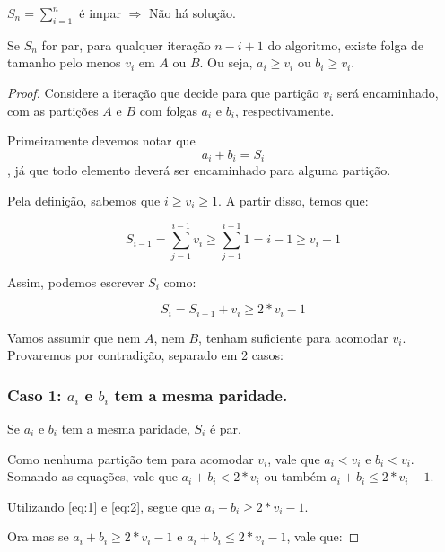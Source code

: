 \begin{prop} \label{particao:odd}
$S_n = \sum_{i = 1}^n$ é impar $\Rightarrow$ Não há solução.
\end{prop}

\begin{prop} \label{particao:proof}
Se $S_n$ for par, para qualquer iteração $n - i + 1$ do algoritmo, existe folga de tamanho pelo menos $v_i$ em $A$ ou $B$. Ou seja, $a_i \geq v_i$ ou $b_i \geq v_i$.
\end{prop}
\begin{proof}

Considere a iteração que decide para que partição $v_i$ será encaminhado, com as partições $A$ e $B$ com folgas $a_i$ e $b_i$, respectivamente.

Primeiramente devemos notar que
\begin{equation} \label{eq:1}
    a_i + b_i = S_i
\end{equation}
, já que todo elemento deverá ser encaminhado para alguma partição.

Pela definição, sabemos que $i \geq v_i \geq 1$. A partir disso, temos que:

$$S_{i - 1} = \sum_{j = 1}^{i - 1} v_i \geq \sum_{j = 1}^{i - 1} 1 = i - 1 \geq v_i - 1$$

Assim, podemos escrever $S_i$ como:

\begin{equation} \label{eq:2}
    S_i = S_{i - 1} + v_i \geq 2*v_i - 1
\end{equation}

Vamos assumir que nem $A$, nem $B$, tenham  suficiente para acomodar $v_i$. Provaremos por contradição, separado em 2 casos:

\subsubsection*{Caso 1: $a_i$ e $b_i$ tem a mesma paridade.}

Se $a_i$ e $b_i$ tem a mesma paridade, $S_i$ é par.

Como nenhuma partição tem  para acomodar $v_i$, vale que $a_i < v_i$ e $b_i < v_i$. Somando as equações, vale que $a_i + b_i < 2*v_i$ ou também $a_i + b_i \leq 2*v_i - 1$.

Utilizando \ref{eq:1} e \ref{eq:2}, segue que $a_i + b_i \geq 2*v_i - 1$.

Ora mas se $a_i + b_i \geq 2*v_i - 1$ e $a_i + b_i \leq 2*v_i - 1$, vale que:


\end{proof}
